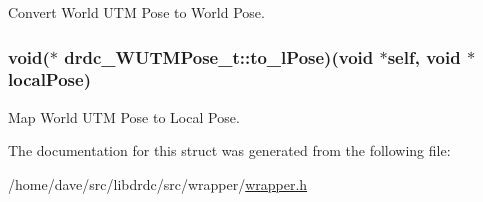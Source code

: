 Convert World UTM Pose to World Pose. 

\hypertarget{structdrdc__WUTMPose__t_5cd9771a71e52c7c7e6f26820019e449}{
\subsubsection[to\_\-lPose]{\setlength{\rightskip}{0pt plus 5cm}void($\ast$ {\bf drdc\_\-WUTMPose\_\-t::to\_\-lPose})(void $\ast$self, void $\ast$localPose)}}
\label{structdrdc__WUTMPose__t_5cd9771a71e52c7c7e6f26820019e449}


Map World UTM Pose to Local Pose. 



The documentation for this struct was generated from the following file:\begin{CompactItemize}
\item 
/home/dave/src/libdrdc/src/wrapper/\hyperlink{wrapper_8h}{wrapper.h}\end{CompactItemize}
